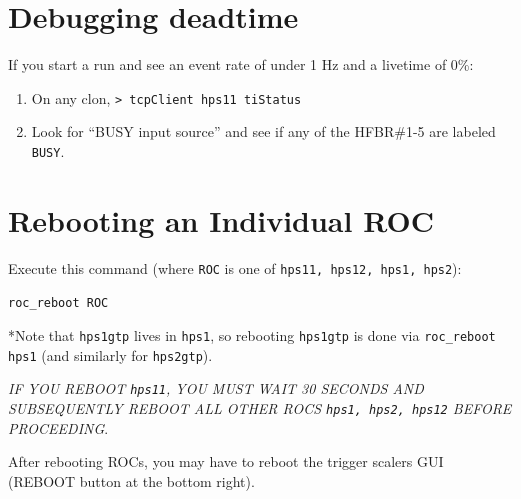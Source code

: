 \documentclass[12pt]{article}
\begin{document}
\section{Debugging deadtime}
%
%
%
%

If you start a run and see an event rate of under 1 Hz and a livetime of 0\%:
\begin{enumerate}
\item On any clon,\newline
\texttt{> tcpClient hps11 tiStatus}\newline
\item Look for ``BUSY input source'' and see if any of the HFBR\#1-5 are labeled \texttt{BUSY}.

\end{enumerate}

\section{Rebooting an Individual ROC}\label{sec:rebootaroc}
Execute this command (where \texttt{ROC} is one of \texttt{hps11, hps12, hps1, hps2}):\newline
\centerline{\texttt{roc\_reboot ROC}}

\vspace{5mm}\noindent
*Note that \texttt{hps1gtp} lives in \texttt{hps1}, so rebooting \texttt{hps1gtp} is done via \texttt{roc\_reboot hps1} (and similarly for \texttt{hps2gtp}).

\vspace{5mm}\noindent
{\em IF YOU REBOOT \texttt{hps11}, YOU MUST WAIT 30 SECONDS AND SUBSEQUENTLY REBOOT ALL OTHER ROCS \texttt{hps1, hps2, hps12} BEFORE PROCEEDING}.

    After rebooting ROCs, you may have to reboot the trigger scalers GUI (REBOOT button at the bottom right).
\end{document}
